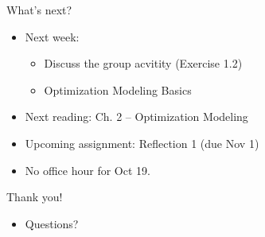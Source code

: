 \documentclass [xcolor=svgnames, handout]{beamer}
\begin{document}
\begin{frame}{What's next?}
    \begin{itemize}[<+->]
        \item Next week: 
        \begin{itemize}[<+->]
            \item Discuss the group acvitity (Exercise 1.2)
            \item Optimization Modeling Basics
        \end{itemize}
        \item Next reading: Ch. 2 -- Optimization Modeling
        \item Upcoming assignment: Reflection 1 (due Nov 1)
        \item No office hour for Oct 19.
    \end{itemize}
\end{frame}

\begin{frame}{Thank you!}
    \begin{itemize}[<+->]
        \item Questions?
    \end{itemize}
\end{frame}
\end{document}
